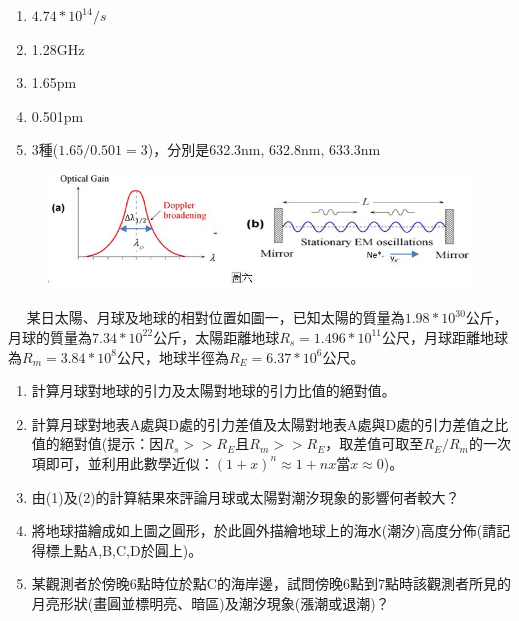 \documentclass[cn,10pt,math=newtx,chinesefont=founder]{elegantbook}
\begin{document}
\begin{solution}
\begin{enumerate}[label=(\arabic*)]
\item $4.74*10^{14}/s$
\item 1.28GHz
\item 1.65pm
\item 0.501pm
\item 3種($1.65/0.501=3$)，分別是632.3nm, 632.8nm, 633.3nm
\end{enumerate}
\end{solution}

\begin{figure}[htbp]
\flushright
\includegraphics[width=1.0\textwidth]{image/6.JPG}
\end{figure}

\newpage






\begin{example}　
    某日太陽、月球及地球的相對位置如圖一，已知太陽的質量為$1.98*10^{30}$公斤，月球的質量為$7.34*10^{22}$公斤，太陽距離地球$R_s=1.496*10^{11}$公尺，月球距離地球為$R_m=3.84*10^8$公尺，地球半徑為$R_E=6.37*10^6$公尺。
    \begin{enumerate}[label=(\arabic*)]
    \item 計算月球對地球的引力及太陽對地球的引力比值的絕對值。
    \item 計算月球對地表A處與D處的引力差值及太陽對地表A處與D處的引力差值之比值的絕對值(提示：因$R_s>>R_E$且$R_m>>R_E$，取差值可取至$R_E/R_m$的一次項即可，並利用此數學近似：${(1+x)}^n\approx 1+nx$當$x\approx 0$)。
    \item 由(1)及(2)的計算結果來評論月球或太陽對潮汐現象的影響何者較大？
    \item 將地球描繪成如上圖之圓形，於此圓外描繪地球上的海水(潮汐)高度分佈(請記得標上點A,B,C,D於圓上)。
    \item 某觀測者於傍晚6點時位於點C的海岸邊，試問傍晚6點到7點時該觀測者所見的月亮形狀(畫圓並標明亮、暗區)及潮汐現象(漲潮或退潮)？
    \end{enumerate}
    
    \rightline{[1]}
\end{example}
\end{document}
